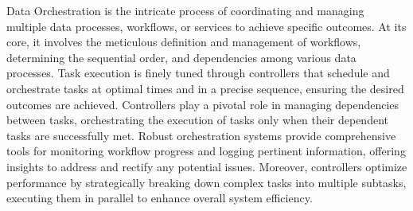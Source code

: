 Data Orchestration is the intricate process of coordinating and managing multiple data processes, workflows, or services to achieve specific outcomes. At its core, it involves the meticulous definition and management of workflows, determining the sequential order, and dependencies among various data processes. Task execution is finely tuned through controllers that schedule and orchestrate tasks at optimal times and in a precise sequence, ensuring the desired outcomes are achieved. Controllers play a pivotal role in managing dependencies between tasks, orchestrating the execution of tasks only when their dependent tasks are successfully met. Robust orchestration systems provide comprehensive tools for monitoring workflow progress and logging pertinent information, offering insights to address and rectify any potential issues. Moreover, controllers optimize performance by strategically breaking down complex tasks into multiple subtasks, executing them in parallel to enhance overall system efficiency.